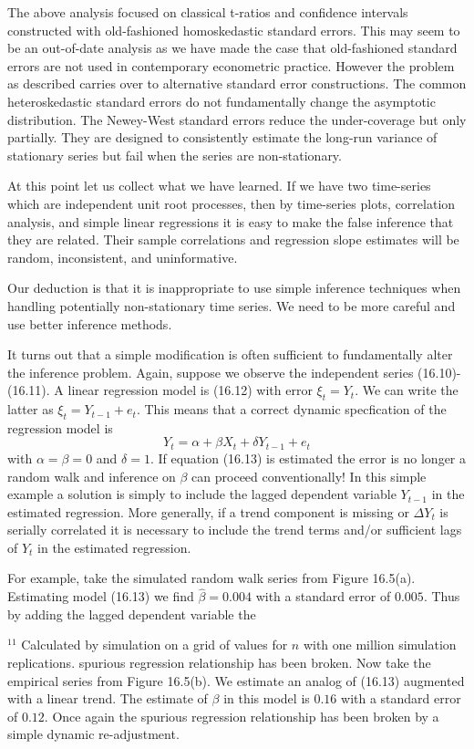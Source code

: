 \documentclass[10pt]{article}
\begin{document}
The above analysis focused on classical t-ratios and confidence intervals constructed with old-fashioned homoskedastic standard errors. This may seem to be an out-of-date analysis as we have made the case that old-fashioned standard errors are not used in contemporary econometric practice. However the problem as described carries over to alternative standard error constructions. The common heteroskedastic standard errors do not fundamentally change the asymptotic distribution. The Newey-West standard errors reduce the under-coverage but only partially. They are designed to consistently estimate the long-run variance of stationary series but fail when the series are non-stationary.

At this point let us collect what we have learned. If we have two time-series which are independent unit root processes, then by time-series plots, correlation analysis, and simple linear regressions it is easy to make the false inference that they are related. Their sample correlations and regression slope estimates will be random, inconsistent, and uninformative.

Our deduction is that it is inappropriate to use simple inference techniques when handling potentially non-stationary time series. We need to be more careful and use better inference methods.

It turns out that a simple modification is often sufficient to fundamentally alter the inference problem. Again, suppose we observe the independent series (16.10)-(16.11). A linear regression model is (16.12) with error $\xi_{t}=Y_{t}$. We can write the latter as $\xi_{t}=Y_{t-1}+e_{t}$. This means that a correct dynamic specfication of the regression model is
$$
Y_{t}=\alpha+\beta X_{t}+\delta Y_{t-1}+e_{t}
$$
with $\alpha=\beta=0$ and $\delta=1$. If equation (16.13) is estimated the error is no longer a random walk and inference on $\beta$ can proceed conventionally! In this simple example a solution is simply to include the lagged dependent variable $Y_{t-1}$ in the estimated regression. More generally, if a trend component is missing or $\Delta Y_{t}$ is serially correlated it is necessary to include the trend terms and/or sufficient lags of $Y_{t}$ in the estimated regression.

For example, take the simulated random walk series from Figure 16.5(a). Estimating model (16.13) we find $\widehat{\beta}=0.004$ with a standard error of $0.005$. Thus by adding the lagged dependent variable the

${ }^{11}$ Calculated by simulation on a grid of values for $n$ with one million simulation replications. spurious regression relationship has been broken. Now take the empirical series from Figure 16.5(b). We estimate an analog of (16.13) augmented with a linear trend. The estimate of $\beta$ in this model is $0.16$ with a standard error of $0.12$. Once again the spurious regression relationship has been broken by a simple dynamic re-adjustment.
\end{document}
